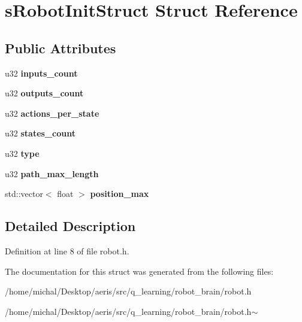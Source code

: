 \hypertarget{structsRobotInitStruct}{\section{s\-Robot\-Init\-Struct Struct Reference}
\label{structsRobotInitStruct}
}
\subsection*{Public Attributes}
\begin{DoxyCompactItemize}
\item 
\hypertarget{structsRobotInitStruct_a05e89c42a36672d311f9b55450feae7e}{u32 {\bfseries inputs\-\_\-count}}\label{structsRobotInitStruct_a05e89c42a36672d311f9b55450feae7e}

\item 
\hypertarget{structsRobotInitStruct_a839c496b7223fee6a6e05ecb30fd8479}{u32 {\bfseries outputs\-\_\-count}}\label{structsRobotInitStruct_a839c496b7223fee6a6e05ecb30fd8479}

\item 
\hypertarget{structsRobotInitStruct_ae623fe7ed544e62fc890c49d2034a16d}{u32 {\bfseries actions\-\_\-per\-\_\-state}}\label{structsRobotInitStruct_ae623fe7ed544e62fc890c49d2034a16d}

\item 
\hypertarget{structsRobotInitStruct_aa1330020b05390b0bbf520beb295b66e}{u32 {\bfseries states\-\_\-count}}\label{structsRobotInitStruct_aa1330020b05390b0bbf520beb295b66e}

\item 
\hypertarget{structsRobotInitStruct_a9e0c80bff990a6831a763c05566e50f3}{u32 {\bfseries type}}\label{structsRobotInitStruct_a9e0c80bff990a6831a763c05566e50f3}

\item 
\hypertarget{structsRobotInitStruct_aa8d35d148e84132ce6474d2c457df3f8}{u32 {\bfseries path\-\_\-max\-\_\-length}}\label{structsRobotInitStruct_aa8d35d148e84132ce6474d2c457df3f8}

\item 
\hypertarget{structsRobotInitStruct_ad4b7c744480abad13b31f5e61a62ce81}{std\-::vector$<$ float $>$ {\bfseries position\-\_\-max}}\label{structsRobotInitStruct_ad4b7c744480abad13b31f5e61a62ce81}

\end{DoxyCompactItemize}


\subsection{Detailed Description}


Definition at line 8 of file robot.\-h.



The documentation for this struct was generated from the following files\-:\begin{DoxyCompactItemize}
\item 
/home/michal/\-Desktop/aeris/src/q\-\_\-learning/robot\-\_\-brain/robot.\-h\item 
/home/michal/\-Desktop/aeris/src/q\-\_\-learning/robot\-\_\-brain/robot.\-h$\sim$\end{DoxyCompactItemize}
